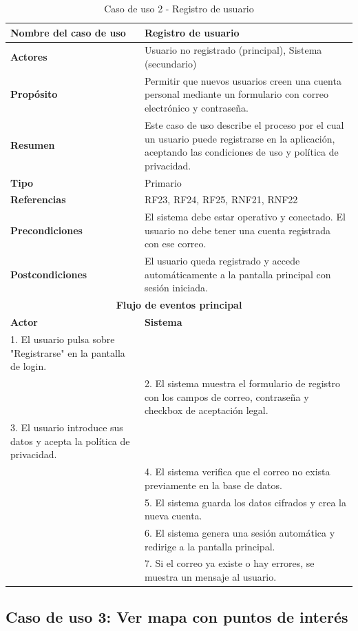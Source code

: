 \begin{table}[H]
\centering
\caption{Caso de uso 2 - Registro de usuario}
\begin{tabular}{|p{4.5cm}|p{10.5cm}|}
\hline
\textbf{Nombre del caso de uso} & Registro de usuario \\
\hline
\textbf{Actores} & Usuario no registrado (principal), Sistema (secundario) \\
\hline
\textbf{Propósito} & Permitir que nuevos usuarios creen una cuenta personal mediante un formulario con correo electrónico y contraseña. \\
\hline
\textbf{Resumen} & Este caso de uso describe el proceso por el cual un usuario puede registrarse en la aplicación, aceptando las condiciones de uso y política de privacidad. \\
\hline
\textbf{Tipo} & Primario \\
\hline
\textbf{Referencias} & RF23, RF24, RF25, RNF21, RNF22 \\
\hline
\textbf{Precondiciones} & El sistema debe estar operativo y conectado. El usuario no debe tener una cuenta registrada con ese correo. \\
\hline
\textbf{Postcondiciones} & El usuario queda registrado y accede automáticamente a la pantalla principal con sesión iniciada. \\
\hline
\multicolumn{2}{|c|}{\textbf{Flujo de eventos principal}} \\
\hline
\textbf{Actor} & \textbf{Sistema} \\
\hline
1. El usuario pulsa sobre "Registrarse" en la pantalla de login. & \\
\hline
& 2. El sistema muestra el formulario de registro con los campos de correo, contraseña y checkbox de aceptación legal. \\
\hline
3. El usuario introduce sus datos y acepta la política de privacidad. & \\
\hline
& 4. El sistema verifica que el correo no exista previamente en la base de datos. \\
\hline
& 5. El sistema guarda los datos cifrados y crea la nueva cuenta. \\
\hline
& 6. El sistema genera una sesión automática y redirige a la pantalla principal. \\
\hline
& 7. Si el correo ya existe o hay errores, se muestra un mensaje al usuario. \\
\hline
\end{tabular}
\end{table}
\subsection{Caso de uso 3: Ver mapa con puntos de interés}

